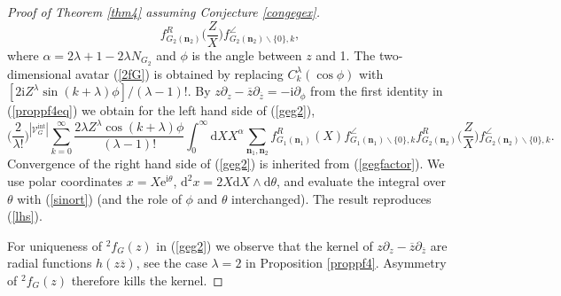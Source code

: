 \documentclass[oneside]{amsart}
\newcommand{\ee}{\mathrm{e}}
\newcommand{\ii}{\mathrm{i}}
\newcommand{\dd}{\mathrm{d}}
\newcommand{\zz}{{\overline{z}}}
\newcommand{\sV}{\mathcal{V}}
\newcommand{\sVGint}{{\sV_G^\mathrm{int}}}
\newcommand{\VGint}{{|\sVGint|}}
\theoremstyle{plain}
\begin{document}
\begin{proof}[Proof of Theorem \ref{thm4} assuming Conjecture \ref{congegex}]
$$f^R_{G_2(\mathbf n_2)}\Big(\!\frac{Z}{X}\!\Big)f^\angle_{G_2(\mathbf n_2)\backslash\{0\},k},
$$
where $\alpha=2\lambda+1-2\lambda N_{G_2}$ and $\phi$ is the angle between $z$ and 1. The two-dimensional avatar (\ref{2fG}) is obtained by replacing $C^\lambda_k(\cos\phi)$ with
$[2\ii Z^\lambda\sin(k+\lambda)\phi]/(\lambda-1)!$. By $z\partial_z-\zz\partial_\zz=-\ii\partial_\phi$ from the first identity in (\ref{proppf4eq}) we obtain for the
left hand side of (\ref{geg2}),
\begin{equation}\label{lhs}
\Big(\frac{2}{\lambda!}\Big)^{\VGint}\sum_{k=0}^\infty\frac{2\lambda Z^\lambda\cos(k+\lambda)\phi}{(\lambda-1)!}\int_0^\infty\dd X X^\alpha
\sum_{\mathbf n_1,\mathbf n_2} f^R_{G_1(\mathbf n_1)}(X)f^\angle_{G_1(\mathbf n_1)\backslash\{0\},k}f^R_{G_2(\mathbf n_2)}\Big(\frac{Z}{X}\Big)f^\angle_{G_2(\mathbf n_2)\backslash\{0\},k}.
\end{equation}
Convergence of the right hand side of (\ref{geg2}) is inherited from (\ref{gegfactor}). We use polar coordinates $x=X\ee^{\ii\theta}$, $\dd^2x=2X\dd X\wedge\dd\theta$,
and evaluate the integral over $\theta$ with (\ref{sinort}) (and the role of $\phi$ and $\theta$ interchanged). The result reproduces (\ref{lhs}).

For uniqueness of ${}^2\!f_G(z)$ in (\ref{geg2}) we observe that the kernel of $z\partial_z-\zz\partial_\zz$ are radial functions $h(z\zz)$, see the case $\lambda=2$ in
Proposition \ref{proppf4}. Asymmetry of ${}^2\!f_G(z)$ therefore kills the kernel.
\end{proof}
\end{document}
